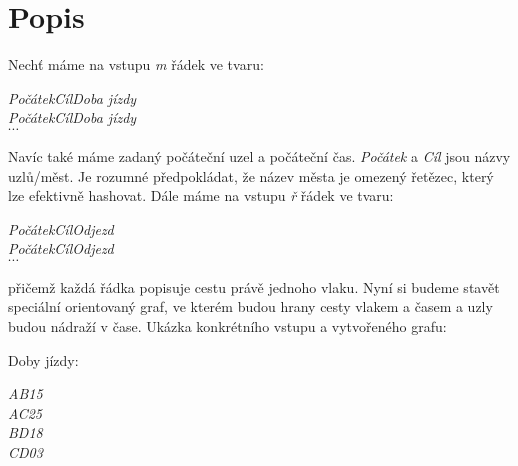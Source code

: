 \documentclass[a4paper]{article}
\begin{document}
\makeatletter
\renewcommand{\@seccntformat}[1]{%
  \ifcsname prefix@#1\endcsname
    \csname prefix@#1\endcsname
  \else
    \csname the#1\endcsname\quad
  \fi}
\newcommand\prefix@section{}
\makeatother


\renewcommand{\headrulewidth}{0pt} %
\thispagestyle{fancy} %
{}

\section{Popis}
Nechť máme na vstupu \textit{m} řádek ve tvaru: 
\begin{center}
	\textit{Počátek\hspace{1cm}Cíl\hspace{1cm}Doba jízdy} \\
	\textit{Počátek\hspace{1cm}Cíl\hspace{1cm}Doba jízdy} \\
	$\cdots$
\end{center} 
Navíc také máme zadaný počáteční uzel a počáteční čas. \textit{Počátek} a \textit{Cíl} jsou názvy uzlů/měst. Je rozumné předpokládat, že název města je omezený řetězec, který lze efektivně hashovat.
Dále máme na vstupu \textit{ř} řádek ve tvaru:
\begin{center}
	\textit{Počátek\hspace{1cm}Cíl\hspace{1cm}Odjezd} \\
	\textit{Počátek\hspace{1cm}Cíl\hspace{1cm}Odjezd} \\
	$\cdots$
\end{center} 
přičemž každá řádka popisuje cestu právě jednoho vlaku. Nyní si budeme stavět speciální orientovaný graf, ve kterém budou hrany cesty vlakem a časem a uzly budou nádraží v čase. Ukázka konkrétního vstupu a vytvořeného grafu:

Doby jízdy:
\begin{center}
	\textit{A\hspace{1cm}B\hspace{1cm}15} \\
	\textit{A\hspace{1cm}C\hspace{1cm}25} \\
	\textit{B\hspace{1cm}D\hspace{1cm}18} \\
	\textit{C\hspace{1cm}D\hspace{1cm}03} \\
\end{center}
\end{document}
